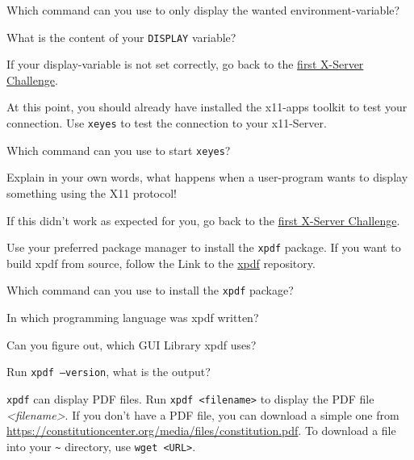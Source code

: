\begin{challenge}
\begin{task}
\begin{questions}
        \item Which command can you use to only display the wanted environment-variable?
        \item What is the content of your \texttt{DISPLAY} variable?
    \end{questions}
    If your display-variable is not set correctly, go back to the \href{https://www.github.com/STEMgraph/}{first X-Server Challenge}.
    \end{task}
    \begin{task}
    At this point, you should already have installed the x11-apps toolkit to test your connection. Use \texttt{xeyes} to test the connection to your x11-Server.
    \begin{questions}
        \item Which command can you use to start \texttt{xeyes}?
        \item Explain in your own words, what happens when a user-program wants to display something using the X11 protocol!
    \end{questions}
    If this didn't work as expected for you, go back to the \href{https://www.github.com/STEMgraph/}{first X-Server Challenge}.
    \end{task}
    \begin{task}
    Use your preferred package manager to install the \texttt{xpdf} package. If you want to build xpdf from source, follow the Link to the \href{https://gitlab.com/xpdf-mirror/xpdf}{xpdf} repository.
    \begin{questions}
        \item Which command can you use to install the \texttt{xpdf} package?
        \item In which programming language was xpdf written?
        \item Can you figure out, which GUI Library xpdf uses?
        \item Run \texttt{xpdf --version}, what is the output?
    \end{questions}
    \end{task}
    \begin{task}
    \texttt{xpdf} can display PDF files. Run \texttt{xpdf <filename>} to display the PDF file \textit{<filename>}. If you don't have a PDF file, you can download a simple one from \href{https://constitutioncenter.org/media/files/constitution.pdf}{https://constitutioncenter.org/media/files/constitution.pdf}. To download a file into your \texttt{\textasciitilde} directory, use \texttt{wget <URL>}.
    \begin{questions}

\end{questions}
\end{task}
\end{challenge}
